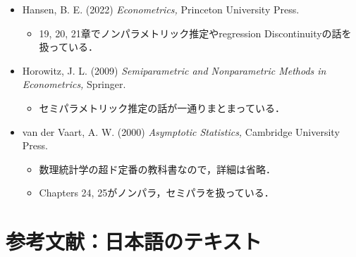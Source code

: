 \documentclass[a4paper,10pt]{jarticle}
\begin{document}
\begin{itemize}
  \item Hansen, B. E. (2022)
        \textit{Econometrics,} Princeton University Press.
        \begin{itemize}
          \item 19, 20, 21章でノンパラメトリック推定やregression Discontinuityの話を扱っている．
        \end{itemize}

  \item Horowitz, J. L. (2009)
        \textit{Semiparametric and Nonparametric Methods in Econometrics,}
        Springer.
        \begin{itemize}
          \item セミパラメトリック推定の話が一通りまとまっている．
        \end{itemize}
  
  \item van der Vaart, A. W. (2000) 
  \textit{Asymptotic Statistics,} Cambridge University Press.
        \begin{itemize}
          \item 数理統計学の超ド定番の教科書なので，詳細は省略．
          \item Chapters 24, 25がノンパラ，セミパラを扱っている．
        \end{itemize}

\end{itemize}


\section{参考文献：日本語のテキスト}
\end{document}
